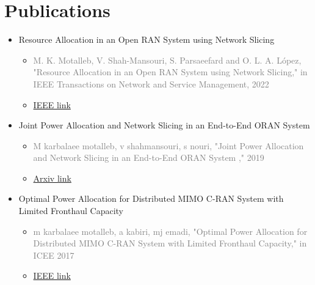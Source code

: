 \documentclass[10pt,a4paper,sans]{moderncv} %
\begin{document}
\section{Publications}
\begin{itemize}
\item
Resource Allocation in an Open RAN System using Network Slicing
\begin{itemize}
\item
\textcolor{gray}{
M. K. Motalleb, V. Shah-Mansouri, S. Parsaeefard and O. L. A. López, "Resource Allocation in an Open RAN System using Network Slicing," in IEEE Transactions on Network and Service Management, 2022 }
\item \textcolor{blue}{\href{https://ieeexplore.ieee.org/document/9888767}{IEEE link}}
\end{itemize}
\item
Joint Power Allocation and Network Slicing in an End-to-End ORAN System
\begin{itemize}
\item
\textcolor{gray}{
M karbalaee motalleb, v shahmansouri, s nouri, "Joint Power Allocation and Network Slicing in an End-to-End ORAN System ," 2019 }
\item \textcolor{blue}{\href{https://arxiv.org/pdf/1911.01904.pdf}{Arxiv link}}
\end{itemize}
\item
Optimal Power Allocation for Distributed MIMO C-RAN System with Limited Fronthaul Capacity
\begin{itemize}
\item
\textcolor{gray}{
m karbalaee motalleb, a kabiri, mj emadi, "Optimal Power Allocation for Distributed MIMO C-RAN System with Limited Fronthaul Capacity," in  ICEE 2017 }
\item \textcolor{blue}{\href{https://ieeexplore.ieee.org/abstract/document/7985380}{IEEE link}}
\end{itemize}

\end{itemize}
\end{document}
